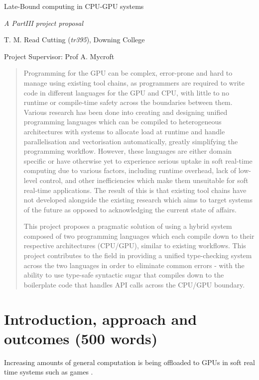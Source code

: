 \documentclass[11pt]{article}
\begin{document}
\centerline{\Large Late-Bound computing in CPU-GPU systems}
\vspace{2em}
\centerline{\Large \emph{A PartIII project proposal}}
\vspace{2em}
\centerline{\large T. M. Read Cutting (\emph{tr395}), Downing College}
\vspace{1em}
\centerline{\large Project Supervisor: Prof A. Mycroft}
\vspace{1em}

\begin{abstract}

Programming for the GPU can be complex, error-prone and hard to manage using
existing tool chains, as programmers are required to write code in different
languages for the GPU and CPU, with little to no runtime or compile-time safety
across the boundaries between them. Various research has been done into
creating and designing unified programming languages which can be compiled to
heterogeneous architectures with systems to allocate load at runtime and handle
parallelisation and vectorisation automatically, greatly simplifying the
programming workflow. However, these languages are either domain specific or
have otherwise yet to experience serious uptake in soft real-time computing due
to various factors, including runtime overhead, lack of low-level control, and
other inefficiencies which make them unsuitable for soft real-time
applications. The result of this is that existing tool chains have not
developed alongside the existing research which aims to target systems of the
future as opposed to acknowledging the current state of affairs.

This project proposes a pragmatic solution of using a hybrid system composed of
two programming languages which each compile down to their respective
architectures (CPU/GPU), similar to existing workflows. This project
contributes to the field in providing a unified type-checking system across the
two languages in order to eliminate common errors - with the ability to use
type-safe syntactic sugar that compiles down to the boilerplate code that
handles API calls across the CPU/GPU boundary.

\end{abstract}

\section{Introduction, approach and outcomes (500 words)}

Increasing amounts of general computation is being offloaded to GPUs in soft
real time systems such as games \cite{GPGPUTechniques2012}.
\end{document}

